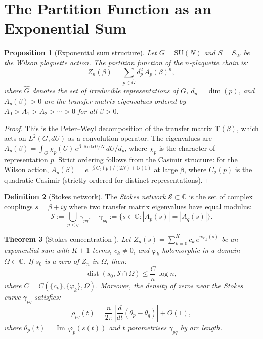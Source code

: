 \documentclass[12pt]{article}
\newtheorem{theorem}{Theorem}[section]
\newtheorem{proposition}[theorem]{Proposition}
\theoremstyle{definition}
\newtheorem{definition}[theorem]{Definition}
\theoremstyle{remark}
\newcommand{\SU}{\mathrm{SU}}
\newcommand{\tr}{\mathrm{tr}}
\newcommand{\re}{\operatorname{Re}}
\newcommand{\im}{\operatorname{Im}}
\newcommand{\dist}{\operatorname{dist}}
\newcommand{\C}{\mathbb{C}}
\newcommand{\abs}[1]{\left|#1\right|}
\begin{document}
\section{The Partition Function as an Exponential Sum}
\label{sec:exp_sum}

\begin{proposition}[Exponential sum structure]
\label{prop:exp_sum}
Let $G = \SU(N)$ and $S = S_W$ be the Wilson plaquette action.
The partition function of the $n$-plaquette chain is:
\begin{equation}\label{eq:Zn}
Z_n(\beta) = \sum_{p \in \widehat{G}} d_p^2\,A_p(\beta)^n,
\end{equation}
where $\widehat{G}$ denotes the set of irreducible representations
of $G$, $d_p = \dim(p)$, and $A_p(\beta) > 0$ are the transfer
matrix eigenvalues ordered by $A_0 > A_1 > A_2 > \cdots > 0$
for all $\beta > 0$.
\end{proposition}

\begin{proof}
This is the Peter--Weyl decomposition of the transfer matrix
$\mathbf{T}(\beta)$, which acts on $L^2(G, dU)$ as a convolution
operator. The eigenvalues are
$A_p(\beta) = \int_G \chi_p(U)\,e^{\beta\,\re\tr U/N}\,dU / d_p$,
where $\chi_p$ is the character of representation $p$.
Strict ordering follows from the Casimir structure: for the Wilson
action, $A_p(\beta) = e^{-\beta\,C_2(p)/(2N) + O(1)}$ at large
$\beta$, where $C_2(p)$ is the quadratic Casimir (strictly ordered
for distinct representations).
\end{proof}

\begin{definition}[Stokes network]
The \emph{Stokes network} $\mathcal{S} \subset \C$ is the set of
complex couplings $s = \beta + iy$ where two transfer matrix
eigenvalues have equal modulus:
\begin{equation}
\mathcal{S} := \bigcup_{p < q}
\gamma_{pq}, \quad
\gamma_{pq} := \{s \in \C : |A_p(s)| = |A_q(s)|\}.
\end{equation}
\end{definition}

\begin{theorem}[Stokes concentration {\cite{OlbrykPsi2026}}]
\label{thm:stokes_conc}
Let $Z_n(s) = \sum_{k=0}^K c_k\,e^{n\varphi_k(s)}$ be an exponential
sum with $K+1$ terms, $c_k \ne 0$, and $\varphi_k$ holomorphic in a
domain $\Omega \subset \C$. If $s_0$ is a zero of $Z_n$ in $\Omega$,
then:
\begin{equation}\label{eq:concentration}
\dist(s_0, \mathcal{S} \cap \Omega)
\le \frac{C}{n}\,\log n,
\end{equation}
where $C = C(\{c_k\}, \{\varphi_k\}, \Omega)$. Moreover, the density
of zeros near the Stokes curve $\gamma_{pq}$ satisfies:
\begin{equation}
\rho_{pq}(t) = \frac{n}{2\pi}\,
\abs{\frac{d}{dt}(\theta_p - \theta_q)} + O(1),
\end{equation}
where $\theta_p(t) = \im\,\varphi_p(s(t))$ and $t$ parametrises
$\gamma_{pq}$ by arc length.
\end{theorem}
\end{document}
